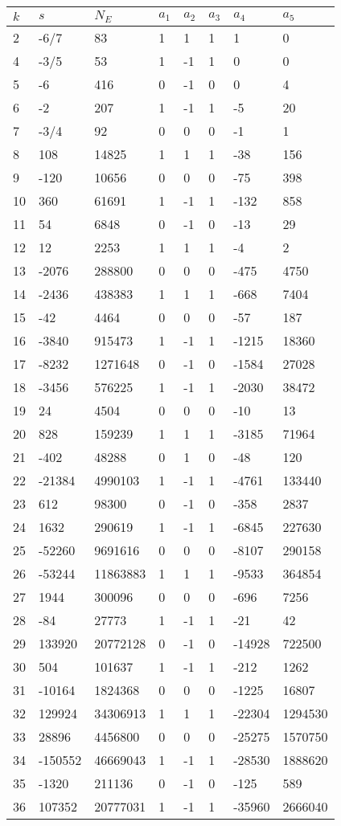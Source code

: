 \documentclass{amsart}
\begin{document}
\begin{longtable}{|l|l|l|lllll|}
\hline
$k$ & $s$ & $N_E$ & $a_1$ & $a_2$ & $a_3$ & $a_4$ & $a_5$\\
\hline
2&-6/7&83&1&1&1&1&0\\
4&-3/5&53&1&-1&1&0&0\\
5&-6&416&0&-1&0&0&4\\
6&-2&207&1&-1&1&-5&20\\
7&-3/4&92&0&0&0&-1&1\\
8&108&14825&1&1&1&-38&156\\
9&-120&10656&0&0&0&-75&398\\
10&360&61691&1&-1&1&-132&858\\
11&54&6848&0&-1&0&-13&29\\
12&12&2253&1&1&1&-4&2\\
13&-2076&288800&0&0&0&-475&4750\\
14&-2436&438383&1&1&1&-668&7404\\
15&-42&4464&0&0&0&-57&187\\
16&-3840&915473&1&-1&1&-1215&18360\\
17&-8232&1271648&0&-1&0&-1584&27028\\
18&-3456&576225&1&-1&1&-2030&38472\\
19&24&4504&0&0&0&-10&13\\
20&828&159239&1&1&1&-3185&71964\\
21&-402&48288&0&1&0&-48&120\\
22&-21384&4990103&1&-1&1&-4761&133440\\
23&612&98300&0&-1&0&-358&2837\\
24&1632&290619&1&-1&1&-6845&227630\\
25&-52260&9691616&0&0&0&-8107&290158\\
26&-53244&11863883&1&1&1&-9533&364854\\
27&1944&300096&0&0&0&-696&7256\\
28&-84&27773&1&-1&1&-21&42\\
29&133920&20772128&0&-1&0&-14928&722500\\
30&504&101637&1&-1&1&-212&1262\\
31&-10164&1824368&0&0&0&-1225&16807\\
32&129924&34306913&1&1&1&-22304&1294530\\
33&28896&4456800&0&0&0&-25275&1570750\\
34&-150552&46669043&1&-1&1&-28530&1888620\\
35&-1320&211136&0&-1&0&-125&589\\
36&107352&20777031&1&-1&1&-35960&2666040\\

\end{longtable}
\end{document}
